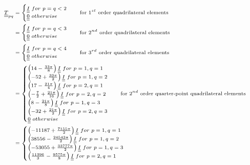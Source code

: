 \documentclass[a4paper]{jpconf}
\begin{document}
\begin{equation}
\scriptsize
\begin{split}
\underline{\underline{T}}_{pq}&=\begin{cases}
\underline{\underline{I}}\ for\ p=q<2\\
\underline{\underline{0}}\ otherwise
\end{cases}\quad \text{for $1^{st}$ order quadrilateral elements}\\
&=\begin{cases}
\underline{\underline{I}}\ for\ p=q<3\\
\underline{\underline{0}}\ otherwise
\end{cases}\quad \text{for $2^{nd}$ order quadrilateral elements}\\
&=\begin{cases}
\underline{\underline{I}}\ for\ p=q<4\\
\underline{\underline{0}}\ otherwise
\end{cases}\quad \text{for $3^{rd}$ order quadrilateral elements}\\
&=\begin{cases}
\left(14-\frac{33\pi}{8}\right)\underline{\underline{I}}\ for\ p=1,q=1\\
\left(-52+\frac{33\pi}{2}\right)\underline{\underline{I}}\ for\ p=1,q=2\\
\left(17-\frac{21\pi}{4}\right)\underline{\underline{I}}\ for\ p=2,q=1\\
\left(-\frac{7}{2}+\frac{21\pi}{16}\right)\underline{\underline{I}}\ for\ p=2,q=2\\
\left(8-\frac{21\pi}{8}\right)\underline{\underline{I}}\ for\ p=1,q=3\\
\left(-32+\frac{21\pi}{2}\right)\underline{\underline{I}}\ for\ p=2,q=3\\
\underline{\underline{0}}\ otherwise
\end{cases}\quad \text{for $2^{nd}$ order quarter-point quadrilateral elements}\\
&=\begin{cases}
\left(-11187+\frac{7155\pi}{2}\right)\underline{\underline{I}}\ for\ p=1,q=1\\
\left(38556-\frac{24543\pi}{2}\right)\underline{\underline{I}}\ for\ p=1,q=2\\
\left(-53055+\frac{33777\pi}{2}\right)\underline{\underline{I}}\ for\ p=1,q=3\\
\left(\frac{11396}{3}-\frac{9575\pi}{8}\right)\underline{\underline{I}}\ for\ p=2,q=1\\

\end{cases}
\end{split}
\end{equation}
\end{document}
